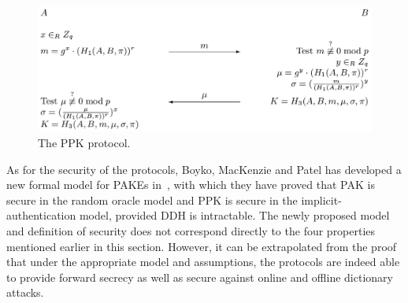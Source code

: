 \begin{figure}[h]
    \centering
    \label{fig:ppk}
    \includegraphics[scale=0.33]{ppk_protocol.png}
    \caption{The PPK protocol.}
\end{figure}
\fi
As for the security of the protocols, Boyko, MacKenzie and Patel has developed a new formal model for
PAKEs in~\cite{BoMaPa00}, with which they have proved that PAK is secure in the random oracle model 
and PPK is secure in the implicit-authentication model, provided DDH is intractable. The newly proposed 
model and definition of security does not correspond directly to the four properties mentioned earlier in this section.
However, it can be extrapolated from the proof that under the appropriate model and 
assumptions, the protocols are indeed able to provide forward secrecy as well as secure against online 
and offline dictionary attacks.












